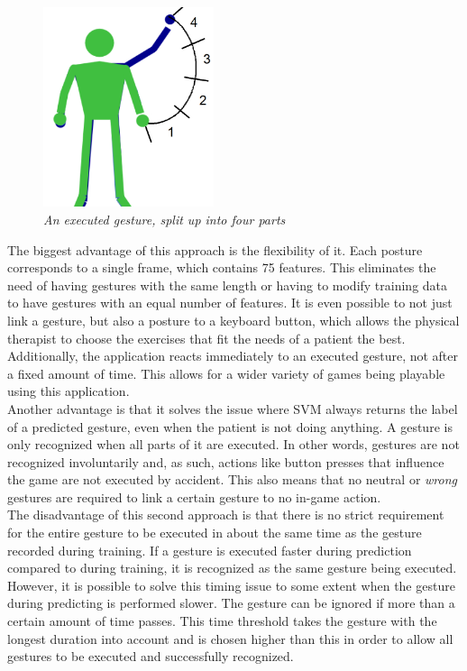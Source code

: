 \begin{figure}[H]
\begin{center}
\includegraphics[width=5cm]{SVMGesture.png}
\caption{\emph{An executed gesture, split up into four parts}}
\label{fig: gesture_split}
\end{center}
\end{figure}

The biggest advantage of this approach is the flexibility of it. Each posture corresponds to a single frame, which contains 75 features. This eliminates the need of having gestures with the same length or having to modify training data to have gestures with an equal number of features. It is even possible to not just link a gesture, but also a posture to a keyboard button, which allows the physical therapist to choose the exercises that fit the needs of a patient the best. Additionally, the application reacts immediately to an executed gesture, not after a fixed amount of time. This allows for a wider variety of games being playable using this application.\\

Another advantage is that it solves the issue where SVM always returns the label of a predicted gesture, even when the patient is not doing anything. A gesture is only recognized when all parts of it are executed. In other words, gestures are not recognized involuntarily and, as such, actions like button presses that influence the game are not executed by accident. This also means that no neutral or \emph{wrong} gestures are required to link a certain gesture to no in-game action.\\

The disadvantage of this second approach is that there is no strict requirement for the entire gesture to be executed in about the same time as the gesture recorded during training. If a gesture is executed faster during prediction compared to during training, it is recognized as the same gesture being executed. However, it is possible to solve this timing issue to some extent when the gesture during predicting is performed slower. The gesture can be ignored if more than a certain amount of time passes. This time threshold takes the gesture with the longest duration into account and is chosen higher than this in order to allow all gestures to be executed and successfully recognized.